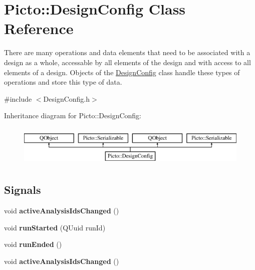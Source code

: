 \hypertarget{class_picto_1_1_design_config}{\section{Picto\-:\-:Design\-Config Class Reference}
\label{class_picto_1_1_design_config}
}


There are many operations and data elements that need to be associated with a design as a whole, accessable by all elements of the design and with access to all elements of a design. Objects of the \hyperlink{class_picto_1_1_design_config}{Design\-Config} class handle these types of operations and store this type of data.  




{\ttfamily \#include $<$Design\-Config.\-h$>$}

Inheritance diagram for Picto\-:\-:Design\-Config\-:\begin{figure}[H]
\begin{center}
\leavevmode
\includegraphics[height=2.000000cm]{class_picto_1_1_design_config}
\end{center}
\end{figure}
\subsection*{Signals}
\begin{DoxyCompactItemize}
\item 
\hypertarget{class_picto_1_1_design_config_a6475c50f0fd8f09f8f77bbbaee9346da}{void {\bfseries active\-Analysis\-Ids\-Changed} ()}\label{class_picto_1_1_design_config_a6475c50f0fd8f09f8f77bbbaee9346da}

\item 
\hypertarget{class_picto_1_1_design_config_a3c3be87938a958f1d8014d2b2c9a490a}{void {\bfseries run\-Started} (Q\-Uuid run\-Id)}\label{class_picto_1_1_design_config_a3c3be87938a958f1d8014d2b2c9a490a}

\item 
\hypertarget{class_picto_1_1_design_config_a75567f431cdbded9393e52fefa3471e8}{void {\bfseries run\-Ended} ()}\label{class_picto_1_1_design_config_a75567f431cdbded9393e52fefa3471e8}

\item 
\hypertarget{class_picto_1_1_design_config_a6475c50f0fd8f09f8f77bbbaee9346da}{void {\bfseries active\-Analysis\-Ids\-Changed} ()}\label{class_picto_1_1_design_config_a6475c50f0fd8f09f8f77bbbaee9346da}

\end{DoxyCompactItemize}
